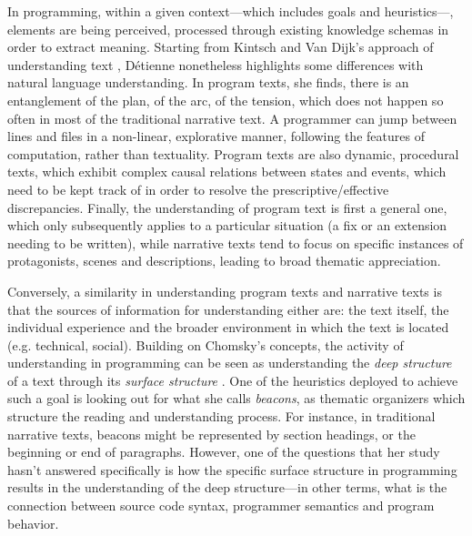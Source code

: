 In programming, within a given context—which includes goals and heuristics—, elements are being perceived, processed through existing knowledge schemas in order to extract meaning. Starting from Kintsch and Van Dijk's approach of understanding text \citep{kintsch_model_1978}, Détienne nonetheless highlights some differences with natural language understanding. In program texts, she finds, there is an entanglement of the plan, of the arc, of the tension, which does not happen so often in most of the traditional narrative text. A programmer can jump between lines and files in a non-linear, explorative manner, following the features of computation, rather than textuality. Program texts are also dynamic, procedural texts, which exhibit complex causal relations between states and events, which need to be kept track of in order to resolve the prescriptive/effective discrepancies. Finally, the understanding of program text is first a general one, which only subsequently applies to a particular situation (a fix or an extension needing to be written), while narrative texts tend to focus on specific instances of protagonists, scenes and descriptions, leading to broad thematic appreciation. %

Conversely, a similarity in understanding program texts and narrative texts is that the sources of information for understanding either are: the text itself, the individual experience and the broader environment in which the text is located (e.g. technical, social). Building on Chomsky's concepts, the activity of understanding in programming can be seen as understanding the \emph{deep structure} of a text through its \emph{surface structure} \citep{chomsky_aspects_1965}. One of the heuristics deployed to achieve such a goal is looking out for what she calls \emph{beacons}, as thematic organizers which structure the reading and understanding process. For instance, in traditional narrative texts, beacons might be represented by section headings, or the beginning or end of paragraphs. However, one of the questions that her study hasn't answered specifically is how the specific surface structure in programming results in the understanding of the deep structure—in other terms, what is the connection between source code syntax, programmer semantics and program behavior.

